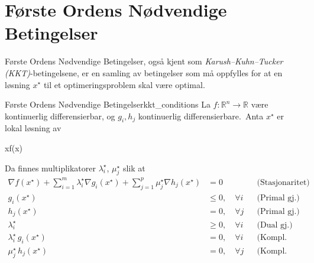 \begin{center}
\end{center}

\section{Første Ordens Nødvendige Betingelser}
\label{sec:optimality_conditions}
Første Ordens Nødvendige Betingelser, også kjent som \emph{Karush--Kuhn--Tucker (KKT)}-betingelsene, er en samling av betingelser som må oppfylles for at en løsning \(x^\star\) til et optimeringsproblem skal være optimal.

\begin{theorem}{Første Ordens Nødvendige Betingelser}{kkt_conditions}
  La \(f: \mathbb{R}^n \to \mathbb{R}\) være kontinuerlig differensierbar, og
  \(g_i, h_j\) kontinuerlig differensierbare.\  
  Anta \(x^\star\) er lokal løsning av
  \begin{mini*}
    {x}{f(x)}{}{}
  \end{mini*}
  Da finnes multiplikatorer \(\lambda_i^\star\), \(\mu_j^\star\) slik at
  \begin{align}
    \nabla f(x^\star)
    + \sum_{i=1}^m \lambda_i^\star\nabla g_i(x^\star)
    + \sum_{j=1}^p \mu_j^\star\nabla h_j(x^\star)
      &= 0  &&\text{(Stasjonaritet)} \\
    g_i(x^\star) &\le 0,\quad \forall i     &&\text{(Primal gj.)} \\
    h_j(x^\star) &= 0,\quad \forall j       &&\text{(Primal gj.)} \\
    \lambda_i^\star &\ge 0,\quad \forall i  &&\text{(Dual gj.)} \\
    \lambda_i^\star\,g_i(x^\star) &=0,\quad \forall i &&\text{(Kompl. slakkhet)}\\
    \mu_j^\star\,h_j(x^\star) &=0,\quad \forall j      &&\text{(Kompl. slakkhet)}
  \end{align}
\end{theorem}

